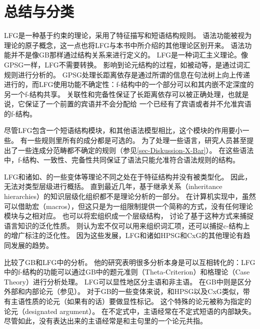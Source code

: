 \section{总结与分类}

LFG是一种基于约束的理论，采用了特征描写和短语结构规则。
语法功能被视为理论的原子概念，这一点也将LFG与本书中所介绍的其他理论区别开来。
语法功能并不是像GB那样通过结构关系来进行定义的。
LFG是一种词汇主义理论。像GPSG一样，LFG不需要转换。
影响到论元结构的过程，如被动等，是通过词汇规则进行分析的。
GPSG处理长距离依存是通过所谓的信息在句法树上向上传递进行的，而LFG使用功能不确定性：f-结构中的一个部分可以和其内嵌不定深度的另一个f-结构共享。
关联性和完备性保证了长距离依存可以被正确处理，也就是说，它保证了一个前置的宾语并不会分配给
一个已经有了宾语或者并不允准宾语的f-结构。

尽管LFG包含一个短语结构模块，和其他语法模型相比，这个模块的作用要小一些。
有一些规则里所有的成分都是可选的。
为了处理一些语言，研究人员甚至提出了一些连成分范畴都不确定的规则（参见\ref{sec-Diskussion-X-Bar}）。
在这些语法中，f-结构、一致性、完备性共同保证了语法只能允准符合语法规则的结构。

LFG和诸如\hpsgc、\cxgc 的一些变体等理论不同之处在于特征结构并没有被类型化。
因此，无法对类型层级进行概括。
直到最近几年，基于继承关系（inheritance hierarchies）的知识层级化组织都不是理论分析的一部分。
在计算机实现中，虽然可以借助宏（macros），但这只是为一组限制提供一个简称的方式，没有任何理论模块与之相对应。
也可以将宏组织成一个层级结构， 讨论了基于这种方式来捕捉语言知识的泛化性质。
 \citet*{ADT2008a}则认为宏不仅可以用来组织词汇项，还可以捕捉c-结构上的增广标注的泛化性。
因为这些发展，LFG和诸如HPSG和CxG的其他理论有趋同发展的趋势。

 \citet{Williams84a}比较了GB和LFG中的分析。
他的研究表明很多分析本身是可以互相转化的：LFG中的f-结构的功能可以通过GB中的题元准则（Theta-Criterion）和格理论（Case Theory）进行分析处理。
LFG可以显性地区分主语和非主语。
在GB中则是区分外部和内部论元（参见\citealp[\S~1.2]{Williams84a}）。
对于GB的一些变体来说，和HPSG\indexhpsgc 以及CxG\indexcxgc 类似，带有主语性质的论元（如果有的话）要做显性标记\citep{Haider86,HM94a,Mueller2003e,MR2001a}。
这个特殊的论元被称为指定的论元（designated argument）。
在不定式中，主语经常在不定式短语的内部缺失。
尽管如此，没有表达出来的主语经常是和主句里的一个论元共指。

